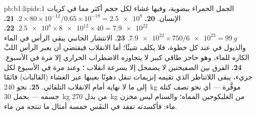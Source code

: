 \begin{solution}{pb:b1:lipids:1}
الجمل الحمراء بيضوية، وفيها غشاء لكل حجم أكثر مما في كريات الإنسان.
\textbf{20.} $2\times 80\times 10^{-12}/0.65\times 10^{-18} = \num{2.5e8}$.
\textbf{21.} $\num{2.5e8}\times\num{8e12}\times 40 = \num{7.9e22}$.
\textbf{22.} $\num{7.9e22}\times 750/\num{6e23} = \qty{99}{g}$.
\textbf{23.} الانتشار الجانبي يبقي الرأس في الماء والذيول في 
عند كل خطوة، فلا يكلف شيئًا؛ أما الانقلاب فيقتضي أن يعبر الرأس 
اللبَّ الكاره للماء، وهو حاجز طاقي كبير لا يتجاوزه الاضطراب الحراري
إلا مرة في الأسبوع.
\textbf{24.} الفرق بين الصفيحتين لا يضمحل إلا بسرعة انقلاب ؛
وعند مرة في الأسبوع لكل جزيء، يبقى اللاتناظر الذي تقيمه إنزيمات
تنقل دهونًا بعينها عبر الغشاء (القالبات) قائمًا إلى ما لا نهاية أمام
الانقلاب التلقائي.
\textbf{25.} نحو \qty{240}{kg} موفَّرة --- أي نحو نصف كتلة جسمه ---
بحمل \qty{30}{kg} من  بدل \qty{270}{kg} من الغليكوجين المماه؛
والسنام ليس مخزن ماء: فأكسدته تفقد في النفَس خمسة أمثال ما تنتجه من
ماء.
\end{solution}
